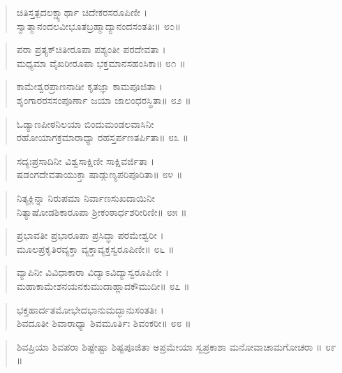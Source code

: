 \begin{verse}
ಚಿತಿಸ್ತತ್ಪದಲಕ್ಷ್ಯಾರ್ಥಾ ಚಿದೇಕರಸರೂಪಿಣೀ ।\\ಸ್ವಾತ್ಮಾನಂದಲವೀಭೂತಬ್ರಹ್ಮಾದ್ಯಾನಂದಸಂತತಿಃ\num{॥ ೮೦॥}
\end{verse}

\begin{verse}
ಪರಾ ಪ್ರತ್ಯಕ್​ಚಿತೀರೂಪಾ ಪಶ್ಯಂತೀ ಪರದೇವತಾ ।\\ಮಧ್ಯಮಾ  ವೈಖರೀರೂಪಾ ಭಕ್ತಮಾನಸಹಂಸಿಕಾ\num{॥ ೮೧ ॥}
\end{verse}

\begin{verse}
ಕಾಮೇಶ್ವರಪ್ರಾಣನಾಡೀ ಕೃತಜ್ಞಾ ಕಾಮಪೂಜಿತಾ ।\\ಶೃಂಗಾರರಸಸಂಪೂರ್ಣಾ ಜಯಾ ಜಾಲಂಧರಸ್ಥಿತಾ\num{॥ ೮೨ ॥}
\end{verse}

\begin{verse}
ಓಡ್ಯಾಣಪೀಠನಿಲಯಾ ಬಿಂದುಮಂಡಲವಾಸಿನೀ \\ರಹೋಯಾಗಕ್ರಮಾರಾಧ್ಯಾ ರಹಸ್ತರ್ಪಣತರ್ಪಿತಾ\num{॥ ೮೩ ॥}
\end{verse}

\begin{verse}
ಸದ್ಯಃಪ್ರಸಾದಿನೀ ವಿಶ್ವಸಾಕ್ಷಿಣೀ ಸಾಕ್ಷಿವರ್ಜಿತಾ ।\\ಷಡಂಗದೇವತಾಯುಕ್ತಾ ಷಾಡ್ಗುಣ್ಯಪರಿಪೂರಿತಾ\num{॥ ೮೪ ॥}
\end{verse}

\begin{verse}
ನಿತ್ಯಕ್ಲಿನ್ನಾ ನಿರುಪಮಾ ನಿರ್ವಾಣಸುಖದಾಯಿನೀ \\ನಿತ್ಯಾಷೋಡಶಿಕಾರೂಪಾ ಶ್ರೀಕಂಠಾರ್ಧಶರೀರಿಣೀ\num{॥ ೮೫ ॥}
\end{verse}

\begin{verse}
ಪ್ರಭಾವತೀ ಪ್ರಭಾರೂಪಾ ಪ್ರಸಿದ್ಧಾ ಪರಮೇಶ್ವರೀ ।\\ಮೂಲಪ್ರಕೃತಿರವ್ಯಕ್ತಾ ವ್ಯಕ್ತಾವ್ಯಕ್ತಸ್ವರೂಪಿಣೀ\num{॥ ೮೬ ॥}
\end{verse}

\begin{verse}
ವ್ಯಾಪಿನೀ ವಿವಿಧಾಕಾರಾ ವಿದ್ಯಾಽವಿದ್ಯಾಸ್ವರೂಪಿಣೀ ।\\ಮಹಾಕಾಮೇಶನಯನಕುಮುದಾಹ್ಲಾದಕೌಮುದೀ\num{॥ ೮೭ ॥}
\end{verse}

\begin{verse}
ಭಕ್ತಹಾರ್ದತಮೋಭೇದಭಾನುಮದ್ಭಾನುಸಂತತಿಃ ।\\ಶಿವದೂತೀ ಶಿವಾರಾಧ್ಯಾ ಶಿವಮೂರ್ತಿಃ ಶಿವಂಕರೀ\num{॥ ೮೮ ॥}
\end{verse}

\begin{verse}
ಶಿವಪ್ರಿಯಾ ಶಿವಪರಾ ಶಿಷ್ಟೇಷ್ಟಾ ಶಿಷ್ಟಪೂಜಿತಾ ಅಪ್ರಮೇಯಾ ಸ್ವಪ್ರಕಾಶಾ ಮನೋವಾಚಾಮಗೋಚರಾ \num{॥ ೮೯ ॥}
\end{verse}

